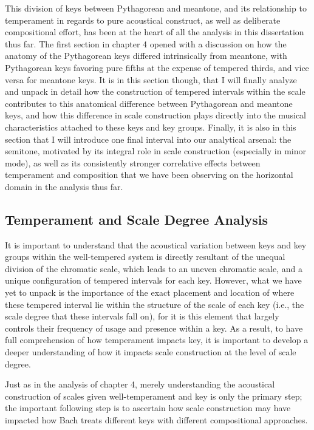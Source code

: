 This division of keys between Pythagorean and meantone, and its
relationship to temperament in regards to pure acoustical construct, as
well as deliberate compositional effort, has been at the heart of all
the analysis in this dissertation thus far. The first section in chapter
4 opened with a discussion on how the anatomy of the Pythagorean keys
differed intrinsically from meantone, with Pythagorean keys favoring
pure fifths at the expense of tempered thirds, and vice versa for
meantone keys. It is in this section though, that I will finally analyze
and unpack in detail how the construction of tempered intervals within
the scale contributes to this anatomical difference between Pythagorean
and meantone keys, and how this difference in scale construction plays
directly into the musical characteristics attached to these keys and key
groups. Finally, it is also in this section that I will introduce one
final interval into our analytical arsenal: the semitone, motivated by
its integral role in scale construction (especially in minor mode), as
well as its consistently stronger correlative effects between
temperament and composition that we have been observing on the
horizontal domain in the analysis thus far.

\subsection{Temperament and Scale Degree
Analysis}\label{temperament-and-scale-degree-analysis}

It is important to understand that the acoustical variation between keys
and key groups within the well-tempered system is directly resultant of
the unequal division of the chromatic scale, which leads to an uneven
chromatic scale, and a unique configuration of tempered intervals for
each key. However, what we have yet to unpack is the importance of the
exact placement and location of where these tempered interval lie within
the structure of the scale of each key (i.e., the scale degree that
these intervals fall on), for it is this element that largely controls
their frequency of usage and presence within a key. As a result, to have
full comprehension of how temperament impacts key, it is important to
develop a deeper understanding of how it impacts scale construction at
the level of scale degree.

Just as in the analysis of chapter 4, merely understanding the
acoustical construction of scales given well-temperament and key is only
the primary step; the important following step is to ascertain how scale
construction may have impacted how Bach treats different keys with
different compositional approaches.

